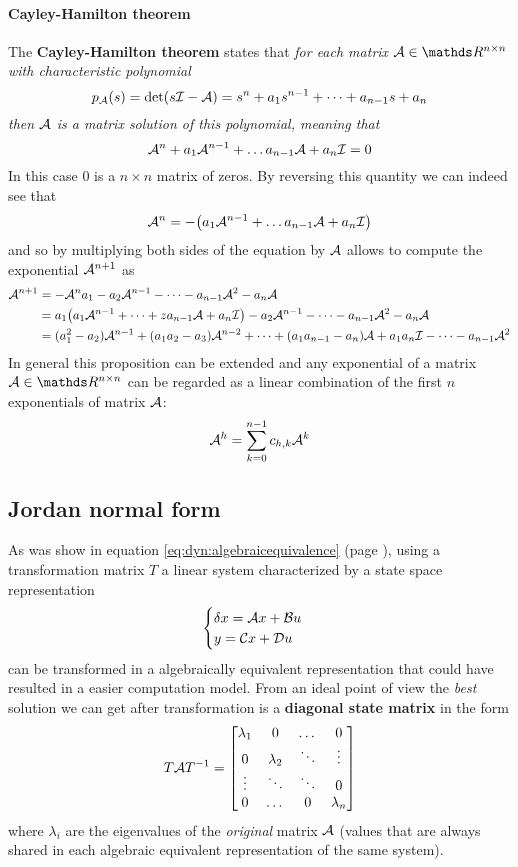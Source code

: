	\paragraph{Cayley-Hamilton theorem} The \textbf{Cayley-Hamilton theorem} states that { \itshape for each matrix $\A \in \mathds R^{n\times n}$ with characteristic polynomial
	\[ p_{\mathcal{A}}(s) = \det (s\mathcal{I} -\mathcal{A}) = s^n + a_1 s^{n-1} + \dots + a_{n-1} s + a_n \] then  $\mathcal{A}$ is a matrix solution of this polynomial, meaning that
	\[ \mathcal{A}^n + a_1 \mathcal{A}^{n-1} + \dots a_{n-1} \mathcal{A} + a_n \mathcal{I} = 0 \] }
	In this case $0$ is a $n\times n$ matrix of zeros. By reversing this quantity we can indeed see that
	\[ \mathcal{A}^n = - \big( a_1 \mathcal{A}^{n-1} + \dots a_{n-1} \mathcal{A} + a_n \mathcal{I} \big) \]
	and so by multiplying both sides of the equation by $\mathcal{A}$ allows to compute the exponential $\mathcal{A}^{n+1}$ as
	\begin{align*}
		\mathcal{A}^{n+1} & = -\mathcal{A}^n a_1 - a_2 \mathcal{A}^{n-1} - \dots - a_{n-1}\mathcal{A}^2 - a_n \mathcal{A}  \\
		& = a_1\big(a_1 \mathcal{A}^{n-1} + \dots + za_{n-1} \mathcal{A} + a_n \mathcal{I} \big) - a_2 \mathcal{A}^{n-1} - \dots - a_{n-1}\mathcal{A}^2 - a_n \mathcal{A} \\
		& = (a_1^2 - a_2) \mathcal{A}^{n-1} + (a_1 a_2 - a_3) \mathcal{A}^{n-2} + \dots + (a_1 a_{n-1} - a_n) \mathcal{A} + a_1 a_n \mathcal{I} - \dots -a_{n-1} \mathcal{A}^2
	\end{align*}
	In general this proposition can be extended and any exponential of a matrix $\A \in \mathds R^{n\times n}$ can be regarded as a linear combination of the first $n$ exponentials of matrix $\mathcal{A}$:
	\begin{equation} \label{eq:lin:cayley}
		\mathcal{A}^h = \sum_{k=0}^{n-1} c_{h,k} \mathcal{A}^k
	\end{equation}

	\subsection{Jordan normal form}
		As was show in equation \ref{eq:dyn:algebraicequivalence} (page \pageref{eq:dyn:algebraicequivalence}), using a transformation matrix $T$ a linear system characterized by a state space representation
		\[ \begin{cases}
			\delta x = \mathcal{A} x + \mathcal{B} u \\ y = \mathcal{C} x + \mathcal{D} u
		\end{cases} \]
		can be transformed in a algebraically equivalent representation that could have resulted in a easier computation model. From an ideal point of view the \textit{best} solution we can get after transformation is a \textbf{diagonal state matrix} in the form
		\[ T \mathcal{A} T^{-1} = \begin{bmatrix}  \lambda_1 & 0 & \dots & 0 \\
		0 & \lambda_2 & \ddots  & \vdots \\ 
		\vdots & \ddots & \ddots & 0 \\
		0 & \dots & 0 & \lambda_n  \end{bmatrix} \]
		where $\lambda_i$ are the eigenvalues of the \textit{original} matrix $\mathcal{A}$ (values that are always shared in each algebraic equivalent representation of the same system).
		

